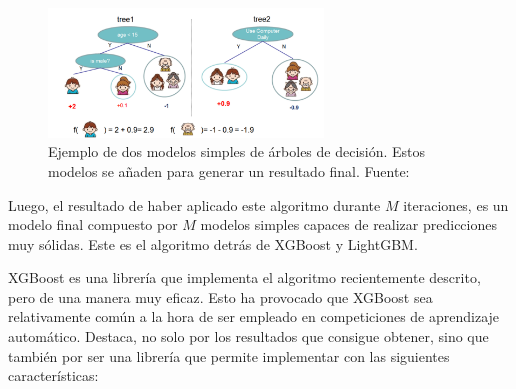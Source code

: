 \begin{figure}[H]
    \centering
    \includegraphics[width = 0.65\textwidth]{imgs/simple_gbm_tree.png}
    \caption{Ejemplo de dos modelos simples de árboles de decisión. Estos modelos se añaden para generar un resultado final. \scriptsize{Fuente: \parencite{XGBoost}}}
    \label{simple_gbm_tree}
\end{figure}
Luego, el resultado de haber aplicado este algoritmo durante $M$ iteraciones, es un modelo final compuesto por $M$ modelos simples capaces de realizar predicciones muy sólidas. Este es el algoritmo detrás de XGBoost y LightGBM. 


XGBoost \parencite{XGBoost} es una librería que implementa el algoritmo recientemente descrito, pero de una manera muy eficaz. Esto ha provocado que XGBoost sea relativamente común a la hora de ser empleado en competiciones de aprendizaje automático\fnm. Destaca, no solo por los resultados que consigue obtener, sino que también por ser una librería que permite implementar  con las siguientes características:

